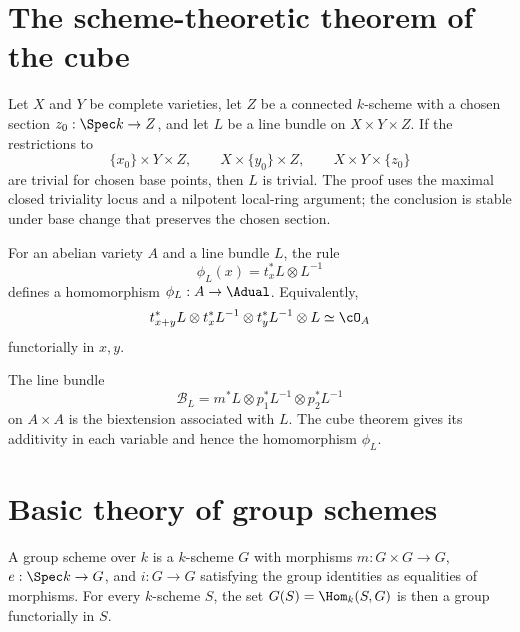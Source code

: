 \section{The scheme-theoretic theorem of the cube}
\label{mumford-III10}

\begin{theorem}
\label{mumford-thm-cube-schemes}
Let $X$ and $Y$ be complete varieties, let $Z$ be a connected $k$-scheme with
a chosen section $z_0:\Spec k\to Z$, and let $L$ be a line bundle on
$X\times Y\times Z$.  If the restrictions to
\[
 \{x_0\}\times Y\times Z,\qquad X\times\{y_0\}\times Z,
 \qquad X\times Y\times\{z_0\}
\]
are trivial for chosen base points, then $L$ is trivial.  The proof uses the
maximal closed triviality locus and a nilpotent local-ring argument; the
conclusion is stable under base change that preserves the chosen section.
\notready
\end{theorem}

\begin{proposition}
\label{mumford-prop-square}
For an abelian variety $A$ and a line bundle $L$, the rule
\[
 \phi_L(x)=t_x^*L\otimes L^{-1}
\]
defines a homomorphism $\phi_L:A\to\Adual$.  Equivalently,
\[
 t_{x+y}^*L\otimes t_x^*L^{-1}\otimes t_y^*L^{-1}\otimes L
\simeq\cO_A
\]
functorially in $x,y$.
\notready
\end{proposition}

\begin{definition}
\label{mumford-def-biextension}
The line bundle
\[
 \mathcal B_L=m^*L\otimes p_1^*L^{-1}\otimes p_2^*L^{-1}
\]
on $A\times A$ is the biextension associated with $L$.  The cube theorem
gives its additivity in each variable and hence the homomorphism $\phi_L$.
\notready
\end{definition}

\section[Group schemes]{Basic theory of group schemes}
\label{mumford-III11}

\begin{definition}
\label{mumford-def-group-scheme}
A group scheme over $k$ is a $k$-scheme $G$ with morphisms
$m:G\times G\to G$, $e:\Spec k\to G$, and $i:G\to G$ satisfying the group
identities as equalities of morphisms.  For every $k$-scheme $S$, the set
$G(S)=\Hom_k(S,G)$ is then a group functorially in $S$.
\notready
\end{definition}

